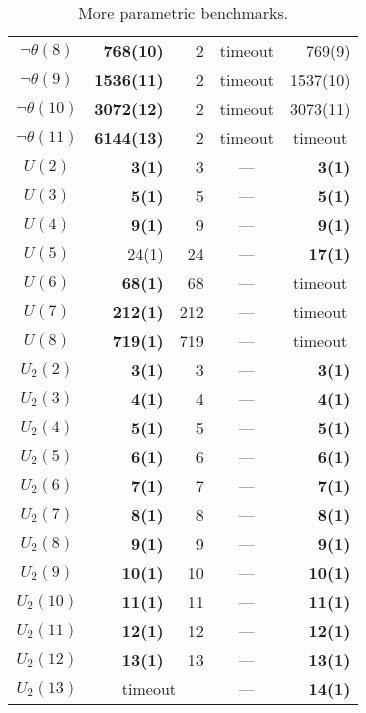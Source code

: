 \documentclass{llncs}
\begin{document}
\begin{table}[b]
\begin{tabular}{|c||r@{\quad}r@{\quad}|r@{\quad}r@{\quad}|r@{\quad}|}
$\neg\theta(8)$ & \textbf{768(10)}& 2 & \multicolumn{2}{|c|}{timeout}  & 769(9) \\
$\neg\theta(9)$ & \textbf{1536(11)}& 2 & \multicolumn{2}{|c|}{timeout}  & 1537(10) \\
$\neg\theta(10)$ & \textbf{3072(12)}& 2 & \multicolumn{2}{|c|}{timeout}  & 3073(11) \\
$\neg\theta(11)$ & \quad\textbf{6144(13)}& 2 & \multicolumn{2}{|c|}{timeout}  & \multicolumn{1}{|c|}{timeout}\\
\hline
$U(2)$ & \textbf{3(1)}& 3 & \multicolumn{2}{|c|}{---} & \textbf{3(1)} \\
$U(3)$ & \textbf{5(1)}& 5 & \multicolumn{2}{|c|}{---} & \textbf{5(1)} \\
$U(4)$ & \textbf{9(1)}& 9 & \multicolumn{2}{|c|}{---} & \textbf{9(1)} \\
$U(5)$ & 24(1)& 24 & \multicolumn{2}{|c|}{---} & \textbf{17(1)} \\
$U(6)$ & \textbf{68(1)}& 68 & \multicolumn{2}{|c|}{---} & \multicolumn{1}{|c|}{timeout}\\
$U(7)$ & \textbf{212(1)}& 212 & \multicolumn{2}{|c|}{---} & \multicolumn{1}{|c|}{timeout}\\
$U(8)$ & \textbf{719(1)}& 719 & \multicolumn{2}{|c|}{---} & \multicolumn{1}{|c|}{timeout}\\
\hline
$U_2(2)$ & \textbf{3(1)}& 3 & \multicolumn{2}{|c|}{---} & \textbf{3(1)} \\
$U_2(3)$ & \textbf{4(1)}& 4 & \multicolumn{2}{|c|}{---} & \textbf{4(1)} \\
$U_2(4)$ & \textbf{5(1)}& 5 & \multicolumn{2}{|c|}{---} & \textbf{5(1)} \\
$U_2(5)$ & \textbf{6(1)}& 6 & \multicolumn{2}{|c|}{---} & \textbf{6(1)} \\
$U_2(6)$ & \textbf{7(1)}& 7 & \multicolumn{2}{|c|}{---} & \textbf{7(1)} \\
$U_2(7)$ & \textbf{8(1)}& 8 & \multicolumn{2}{|c|}{---} & \textbf{8(1)} \\
$U_2(8)$ & \textbf{9(1)}& 9 & \multicolumn{2}{|c|}{---} & \textbf{9(1)} \\
$U_2(9)$ & \textbf{10(1)}& 10 & \multicolumn{2}{|c|}{---} & \textbf{10(1)} \\
$U_2(10)$ & \textbf{11(1)}& 11 & \multicolumn{2}{|c|}{---} & \textbf{11(1)} \\
$U_2(11)$ & \textbf{12(1)}& 12 & \multicolumn{2}{|c|}{---} & \textbf{12(1)} \\
$U_2(12)$ & \textbf{13(1)}& 13 & \multicolumn{2}{|c|}{---} & \textbf{13(1)} \\
$U_2(13)$ & \multicolumn{2}{c|}{timeout} & \multicolumn{2}{|c|}{---} & \textbf{14(1)} \\
\hline
\end{tabular}
\smallskip
\caption{More parametric benchmarks.} 
\label{tab:app}
\end{table}
\end{document}
